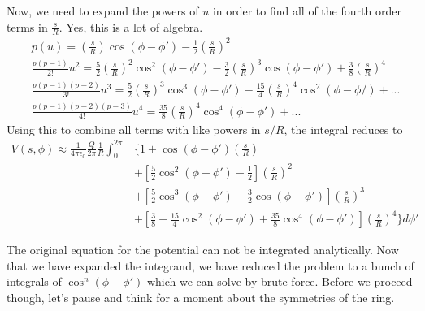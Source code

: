 \documentclass[a4paper, 11pt]{article}
\newenvironment{solution}{%
	\begin{list}{}{%
			\setlength{\topsep}{0pt}%
			\setlength{\leftmargin}{0.5cm}%
			\setlength{\rightmargin}{0.5cm}%
			\setlength{\listparindent}{\parindent}%
			\setlength{\itemindent}{\parindent}%
			\setlength{\parsep}{\parskip}%
		}%
		\item[]}{\end{list}}
\begin{document}
\begin{solution}
  \noindent Now, we need to expand the powers of $u$ in order to find all of the fourth
  order terms in $\frac{s}{R}$. Yes, this is a lot of algebra. 
  \begin{align}
    &p(u) =  \left( \frac{s}{R} \right)\cos(\phi-\phi')-\frac{1}{2}\left( \frac{s}{R} \right)^2\\
    &\frac{p(p-1)}{2!}u^2 = \frac{5}{2}\left( \frac{s}{R} \right)^2\cos^2(\phi-\phi')-\frac{3}{2}\left( \frac{s}{R} \right)^3\cos(\phi-\phi')+\frac{3}{8}\left( \frac{s}{R} \right)^4 \\
    & \frac{p(p-1)(p-2)}{3!}u^3 = \frac{5}{2}\left( \frac{s}{R} \right)^3\cos^3(\phi-\phi')-\frac{15}{4}\left( \frac{s}{R} \right)^4\cos^2(\phi-\phi/) +...\\
    & \frac{p(p-1)(p-2)(p-3)}{4!}u^4 = \frac{35}{8}\left( \frac{s}{R} \right)^4\cos^4(\phi-\phi')+...
  \end{align}
  Using this to combine all terms with like powers in $s/R$, the integral reduces to
  \begin{equation}
    \begin{split}
      V(s,\phi)\approx\frac{1}{4\pi\epsilon_0}\frac{Q}{2\pi}\frac{1}{R}\int_0^{2\pi}&\Bigg\{ 1+\cos(\phi-\phi')\left( \frac{s}{R} \right)\\
      &+ \left[ \frac{5}{2}\cos^2(\phi-\phi')-\frac{1}{2}  \right]\left( \frac{s}{R} \right)^2\\
      &+ \left[ \frac{5}{2}\cos^3(\phi-\phi')-\frac{3}{2}\cos(\phi-\phi')    \right]\left( \frac{s}{R} \right)^3\\
      &+ \left[ \frac{3}{8}-\frac{15}{4}\cos^2(\phi-\phi')+\frac{35}{8}\cos^4(\phi-\phi') \right]\left( \frac{s}{R} \right)^4  \Bigg\}d\phi'
    \end{split}
  \end{equation}

  \noindent The original equation for the potential can not be integrated analytically.
  Now that we have expanded the integrand, we have reduced the problem to a
  bunch of integrals of $\cos^n(\phi-\phi')$ which we can solve by 
  brute force. Before we proceed though, let's pause and think for a
  moment about the symmetries of the ring.\\
  


\end{solution}
\end{document}
